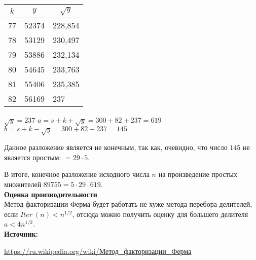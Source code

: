 \documentclass[12pt,a4paper]{scrartcl}
\begin{document}
\begin{table}[h]
	\centering
	\begin{tabular}{|l|l|l|}
		\hline
		\multicolumn{1}{|c|}{\textbf{$k$}} & \multicolumn{1}{c|}{\textbf{$y$}} & \multicolumn{1}{c|}{\textbf{$\sqrt{y}$}} \\ \hline
		77                                 & 52374                             & 228,854                                  \\ \hline
		78                                 & 53129                             & 230,497                                  \\ \hline
		79                                 & 53886                             & 232,134                                  \\ \hline
		80                                 & 54645                             & 233,763                                  \\ \hline
		81                                 & 55406                             & 235,385                                  \\ \hline
		82                                 & 56169                             & 237                                      \\ \hline
	\end{tabular}
\end{table}

\begin{center}
	$\sqrt {y}=237$
	$a=s+k+{\sqrt {y}}=300+82+237=619$
	$b=s+k-{\sqrt {y}}=300+82-237=145$
\end{center}

Данное разложение является не конечным, так как, очевидно, что число $145$ не является простым: $=29\cdot 5.$

В итоге, конечное разложение исходного числа $n$ на произведение простых множителей $89755=5\cdot 29\cdot 619$.\\

\textbf{Оценка производительности}\\

Метод факторизации Ферма будет работать не хуже метода перебора делителей, если $Iter\ (n)<n^{1/2}$, отсюда можно получить оценку для большего делителя $a<4n^{1/2}$.\\


\textbf{Источник:}

\href{https://ru.wikipedia.org/wiki/%D0%9C%D0%B5%D1%82%D0%BE%D0%B4_%D1%84%D0%B0%D0%BA%D1%82%D0%BE%D1%80%D0%B8%D0%B7%D0%B0%D1%86%D0%B8%D0%B8_%D0%A4%D0%B5%D1%80%D0%BC%D0%B0}{https://ru.wikipedia.org/wiki/Метод\_факторизации\_Ферма}
\end{document}
